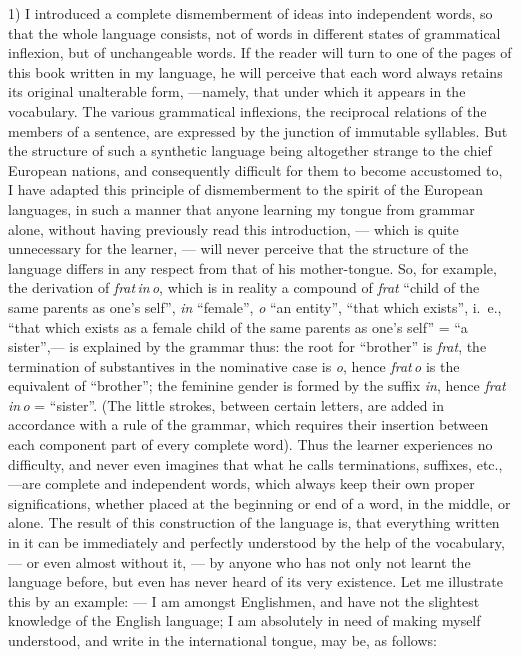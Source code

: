\documentclass[12pt,twoside]{book}
\begin{document}
1) I introduced a complete dismemberment of ideas into independent words, so that the whole language consists, not of words in different states of grammatical inflexion, but of unchangeable words. If the reader will turn to one of the pages of this book written in my language, he will perceive that each word always retains its original unalterable form, ---namely, that under which it appears in the vocabulary. The various grammatical inflexions, the reciprocal relations of the members of a sentence, are expressed by the junction of immutable syllables. But the structure of such a synthetic language being altogether strange to the chief European nations, and consequently difficult for them to become accustomed to, I have adapted this principle of dismemberment to the spirit of the European languages, in such a manner that anyone learning my tongue from grammar alone, without having previously read this introduction, --- which is quite unnecessary for the learner, --- will never perceive that the structure of the language differs in any respect from that of his mother-tongue. So, for example, the derivation of \emph{frat\,in\,o}, which is in reality a compound of \emph{frat} “child of the same parents as one’s self”, \emph{in} “female”, \emph{o} “an entity”, “that which exists”, i.~e., “that which exists as a female child of the same parents as one’s self” = “a sister”,--- is explained by the grammar thus: the root for “brother” is \emph{frat}, the termination of substantives in the nominative case is \emph{o}, hence \emph{frat\,o} is the equivalent of “brother”; the feminine gender is formed by the suffix \emph{in}, hence \emph{frat\,in\,o} = “sister”. (The little strokes, between certain letters, are added in accordance with a rule of the grammar, which requires their insertion between each component part of every complete word). Thus the learner experiences no difficulty, and never even imagines that what he calls terminations, suffixes, etc.,---are complete and independent words, which always keep their own proper significations, whether placed at the beginning or end of a word, in the middle, or alone. The result of this construction of the language is, that everything written in it can be immediately and perfectly understood by the help of the vocabulary, --- or even almost without it, --- by anyone who has not only not learnt the language before, but even has never heard of its very existence. Let me illustrate this by an example: --- I am amongst Englishmen, and have not the slightest knowledge of the English language; I am absolutely in need of making myself understood, and write in the international tongue, may be, as follows:
\end{document}
